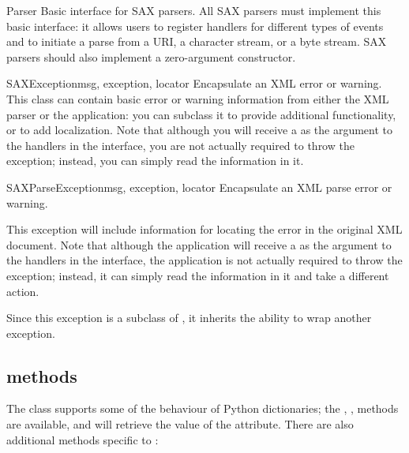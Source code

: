 \documentclass{howto}
\newcommand{\attribute}[1]{\code{#1}}
\begin{document}
\begin{classdesc}{Parser}{}
Basic interface for SAX parsers. All SAX
    parsers must implement this basic interface: it allows users to
    register handlers for different types of events and to initiate a
    parse from a URI, a character stream, or a byte stream. SAX
    parsers should also implement a zero-argument constructor.
\end{classdesc}


\begin{classdesc}{SAXException}{msg, exception, locator}
Encapsulate an XML error or warning. This class can contain
    basic error or warning information from either the XML parser or
    the application: you can subclass it to provide additional
    functionality, or to add localization. Note that although you will
    receive a  as the argument to the handlers in the
     interface, you are not actually required to throw
    the exception; instead, you can simply read the information in
    it.
\end{classdesc}

\begin{classdesc}{SAXParseException}{msg, exception, locator}
Encapsulate an XML parse error or warning.
    
This exception will include information for locating the error in the
    original XML document. Note that although the application will
    receive a  as the argument to the
    handlers in the  interface, the application is not
    actually required to throw the exception; instead, it can simply
    read the information in it and take a different action.

Since this exception is a subclass of , it inherits
    the ability to wrap another exception.
\end{classdesc}


\subsection{ methods}

The  class supports some of the behaviour of
Python dictionaries; the , ,
 methods are available, and  will
retrieve the value of the \attribute{href} attribute.  There are also
additional methods specific to :
\end{document}
